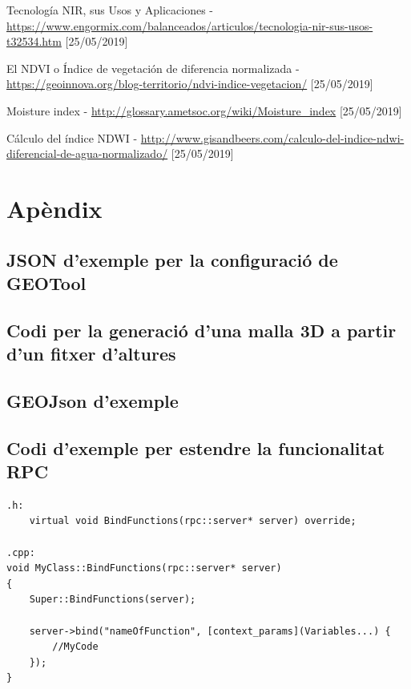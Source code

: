 \documentclass[10pt,a4paper,twocolumn,twoside]{article}
\begin{document}
\begin{thebibliography}{11}
Tecnología NIR, sus Usos y Aplicaciones - \url{https://www.engormix.com/balanceados/articulos/tecnologia-nir-sus-usos-t32534.htm} [25/05/2019]

El NDVI o Índice de vegetación de diferencia normalizada - \url{https://geoinnova.org/blog-territorio/ndvi-indice-vegetacion/} [25/05/2019]

Moisture index - \url{http://glossary.ametsoc.org/wiki/Moisture_index} [25/05/2019]

Cálculo del índice NDWI - \url{http://www.gisandbeers.com/calculo-del-indice-ndwi-diferencial-de-agua-normalizado/} [25/05/2019]

\end{thebibliography}

\appendix
\section*{Apèndix}

\setcounter{section}{1}

\subsection{JSON d'exemple per la configuració de GEOTool}
\label{appendix:geotoolconfig}


\subsection{Codi per la generació d'una malla 3D a partir d'un fitxer d'altures}
\label{appendix:generateobj}


\newpage
\subsection{GEOJson d'exemple}
\label{appendix:geojson}


\subsection{Codi d'exemple per estendre la funcionalitat RPC}
\label{appendix:extendrpc}

\lstset{language=C} 
\begin{lstlisting}
.h:
	virtual void BindFunctions(rpc::server* server) override;
	
.cpp:
void MyClass::BindFunctions(rpc::server* server)
{
	Super::BindFunctions(server);

	server->bind("nameOfFunction", [context_params](Variables...) {
		//MyCode
	});
}

\end{lstlisting}
\end{document}
